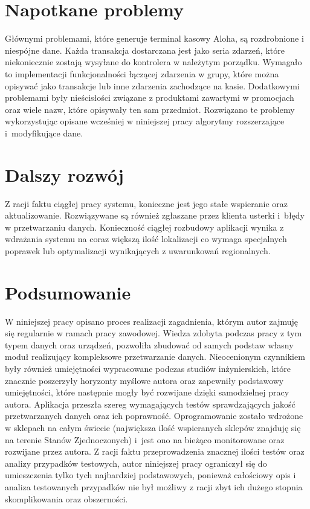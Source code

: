 \documentclass[a4paper]{book}
\begin{document}
\section{Napotkane problemy}
Głównymi problemami, które generuje terminal kasowy Aloha, są rozdrobnione i niespójne dane. Każda transakcja dostarczana jest jako seria zdarzeń, które niekoniecznie zostają wysyłane do kontrolera w należytym porządku. Wymagało to implementacji funkcjonalności łączącej zdarzenia w grupy, które można opisywać jako transakcje lub inne zdarzenia zachodzące na kasie. Dodatkowymi problemami były nieścisłości związane z produktami zawartymi w promocjach oraz wiele nazw, które opisywały ten sam przedmiot. Rozwiązano te problemy wykorzystując opisane wcześniej w niniejszej pracy algorytmy rozszerzające i~modyfikujące dane.
\section{Dalszy rozwój}
Z racji faktu ciągłej pracy systemu, konieczne jest jego stałe wspieranie oraz aktualizowanie. Rozwiązywane są również zgłaszane przez klienta usterki i~błędy w przetwarzaniu danych. Konieczność ciągłej rozbudowy aplikacji wynika z wdrażania systemu na coraz większą ilość lokalizacji co wymaga specjalnych poprawek lub optymalizacji wynikających z uwarunkowań regionalnych.
\section{Podsumowanie}
W niniejszej pracy opisano proces realizacji zagadnienia, którym autor zajmuję się regularnie w ramach pracy zawodowej. Wiedza zdobyta podczas pracy z tym typem danych oraz urządzeń, pozwoliła zbudować od samych podstaw własny moduł realizujący kompleksowe przetwarzanie danych. Nieocenionym czynnikiem były również umiejętności wypracowane podczas studiów inżynierskich, które znacznie poszerzyły horyzonty myślowe autora oraz zapewniły podstawowy umiejętności, które następnie mogły być rozwijane dzięki samodzielnej pracy autora. Aplikacja przeszła szereg wymagających testów sprawdzających jakość przetwarzanych danych oraz ich poprawność. Oprogramowanie zostało wdrożone w sklepach na całym świecie (największa ilość wspieranych sklepów znajduję się na terenie Stanów Zjednoczonych) i~jest ono na bieżąco monitorowane oraz rozwijane przez autora. Z racji faktu przeprowadzenia znacznej ilości testów oraz analizy przypadków testowych, autor niniejszej pracy ograniczył się do umieszczenia tylko tych najbardziej podstawowych, ponieważ całościowy opis i analiza testowanych przypadków nie był możliwy z racji zbyt ich dużego stopnia skomplikowania oraz obszerności. 

	
\cite{tsql}
\cite{ruszglowa}
\cite{wzorceprojektowe}
\cite{algorytmy}
\cite{aspnet}
\cite{progwin}
\cite{perelki}
\end{document}
